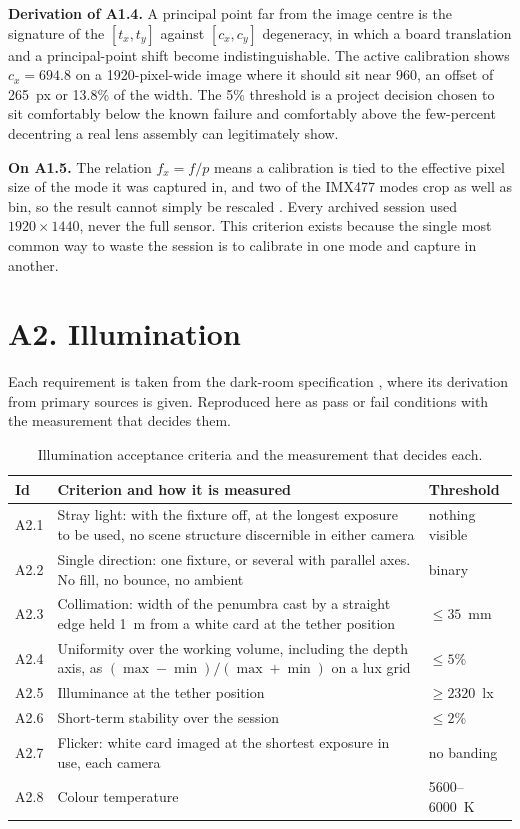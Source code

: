 \textbf{Derivation of A1.4.} A principal point far from the image centre is
the signature of the $[t_x, t_y]$ against $[c_x, c_y]$ degeneracy, in which a
board translation and a principal-point shift become indistinguishable. The
active calibration shows $c_x = 694.8$ on a 1920-pixel-wide image where it
should sit near 960, an offset of 265~px or 13.8\% of the width. The 5\%
threshold is a project decision chosen to sit comfortably below the known
failure and comfortably above the few-percent decentring a real lens
assembly can legitimately show.

\textbf{On A1.5.} The relation $f_x = f / p$ means a calibration is tied to
the effective pixel size of the mode it was captured in, and two of the
IMX477 modes crop as well as bin, so the result cannot simply be rescaled
\cite{raspberrypi_camera_docs}. Every archived session used
$1920 \times 1440$, never the full sensor. This criterion exists because the
single most common way to waste the session is to calibrate in one mode and
capture in another.

\section{A2. Illumination}

Each requirement is taken from the dark-room specification
\cite{linku_darkroom_illumination}, where its derivation from primary sources
is given. Reproduced here as pass or fail conditions with the measurement that
decides them.

\begin{table}[htbp]
\centering
\caption[Illumination acceptance criteria]{Illumination acceptance criteria
and the measurement that decides each.}
\label{tab:crit-light}
\begin{tabularx}{\textwidth}{@{}l X l@{}}
\toprule
\textbf{Id} & \textbf{Criterion and how it is measured} & \textbf{Threshold} \\
\midrule
A2.1 & Stray light: with the fixture off, at the longest exposure to be used,
       no scene structure discernible in either camera & nothing visible \\
A2.2 & Single direction: one fixture, or several with parallel axes. No fill,
       no bounce, no ambient & binary \\
A2.3 & Collimation: width of the penumbra cast by a straight edge held 1~m
       from a white card at the tether position & $\leq 35$~mm \\
A2.4 & Uniformity over the working volume, including the depth axis, as
       $(\max-\min)/(\max+\min)$ on a lux grid & $\leq 5\%$ \\
A2.5 & Illuminance at the tether position & $\geq 2320$~lx \\
A2.6 & Short-term stability over the session & $\leq 2\%$ \\
A2.7 & Flicker: white card imaged at the shortest exposure in use, each
       camera & no banding \\
A2.8 & Colour temperature & 5600--6000~K \\
\bottomrule
\end{tabularx}
\end{table}

